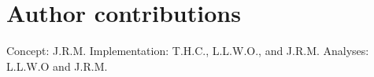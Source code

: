 \documentclass[english]{article}
\begin{document}
\section*{Author contributions}
Concept: J.R.M.  Implementation: T.H.C., L.L.W.O., and
J.R.M.  Analyses: L.L.W.O and J.R.M.



\end{document}

